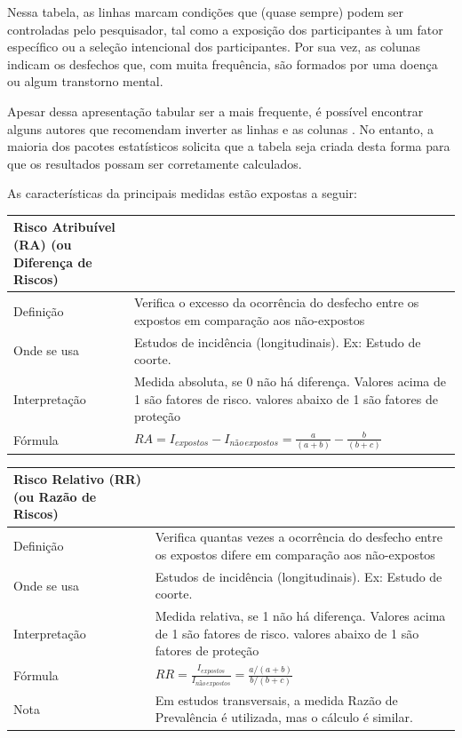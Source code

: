 \documentclass[
]{book}
\begin{document}
Nessa tabela, as linhas marcam condições que (quase sempre) podem ser controladas pelo pesquisador, tal como a exposição dos participantes à um fator específico ou a seleção intencional dos participantes. Por sua vez, as colunas indicam os desfechos que, com muita frequência, são formados por uma doença ou algum transtorno mental.

Apesar dessa apresentação tabular ser a mais frequente, é possível encontrar alguns autores que recomendam inverter as linhas e as colunas \citep{Schoenbach2000}. No entanto, a maioria dos pacotes estatísticos solicita que a tabela seja criada desta forma para que os resultados possam ser corretamente calculados.

As características da principais medidas estão expostas a seguir:

\begin{longtable}[]{@{}
  >{\raggedright\arraybackslash}p{}
  >{\raggedright\arraybackslash}p{}@{}}
\toprule
Risco Atribuível (RA) (ou Diferença de Riscos) & \\
\midrule
\endhead
Definição & Verifica o excesso da ocorrência do desfecho entre os expostos em comparação aos não-expostos \\
Onde se usa & Estudos de incidência (longitudinais). Ex: Estudo de coorte. \\
Interpretação & Medida absoluta, se 0 não há diferença. Valores acima de 1 são fatores de risco. valores abaixo de 1 são fatores de proteção \\
Fórmula & \(RA = I_{expostos}-I_{não \, expostos} = \frac{a}{(a+b)}-\frac{b}{(b+c)}\) \\
\bottomrule
\end{longtable}

\begin{longtable}[]{@{}
  >{\raggedright\arraybackslash}p{}
  >{\raggedright\arraybackslash}p{}@{}}
\toprule
Risco Relativo (RR) (ou Razão de Riscos) & \\
\midrule
\endhead
Definição & Verifica quantas vezes a ocorrência do desfecho entre os expostos difere em comparação aos não-expostos \\
Onde se usa & Estudos de incidência (longitudinais). Ex: Estudo de coorte. \\
Interpretação & Medida relativa, se 1 não há diferença. Valores acima de 1 são fatores de risco. valores abaixo de 1 são fatores de proteção \\
Fórmula & \(RR = \frac{I_{expostos}}{I_{não \, expostos}} = \frac{a/(a+b)}{b/(b+c)}\) \\
Nota & Em estudos transversais, a medida Razão de Prevalência é utilizada, mas o cálculo é similar. \\
\bottomrule
\end{longtable}
\end{document}
